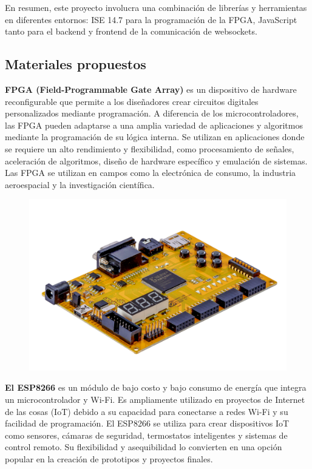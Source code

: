 \documentclass[journal]{IEEEtran}
\begin{document}
En resumen, este proyecto involucra una combinación de librerías y herramientas en diferentes entornos: ISE 14.7 para la programación de la FPGA, 
JavaScript tanto para el backend y frontend de la comunicación de websockets.

\subsection{Materiales propuestos}


\textbf{FPGA (Field-Programmable Gate Array) }es un dispositivo de hardware reconfigurable que permite a los diseñadores crear circuitos digitales personalizados mediante programación. A diferencia de los microcontroladores, las FPGA pueden adaptarse a una amplia variedad de aplicaciones y algoritmos mediante la programación de su lógica interna. Se utilizan en aplicaciones donde se requiere un alto rendimiento y flexibilidad, como procesamiento de señales, aceleración de algoritmos, diseño de hardware específico y emulación de sistemas. Las FPGA se utilizan en campos como la electrónica de consumo, la industria aeroespacial y la investigación científica.

\begin{figure}[H]
\begin{center}
    \includegraphics[scale=0.8]{images/ElbertV2_2-2-1-A.png}
    \end{center}
\end{figure}

\textbf{El ESP8266} es un módulo de bajo costo y bajo consumo de energía que integra un microcontrolador y Wi-Fi. Es ampliamente utilizado en proyectos de Internet de las cosas (IoT) debido a su capacidad para conectarse a redes Wi-Fi y su facilidad de programación. El ESP8266 se utiliza para crear dispositivos IoT como sensores, cámaras de seguridad, termostatos inteligentes y sistemas de control remoto. Su flexibilidad y asequibilidad lo convierten en una opción popular en la creación de prototipos y proyectos finales.
\end{document}
